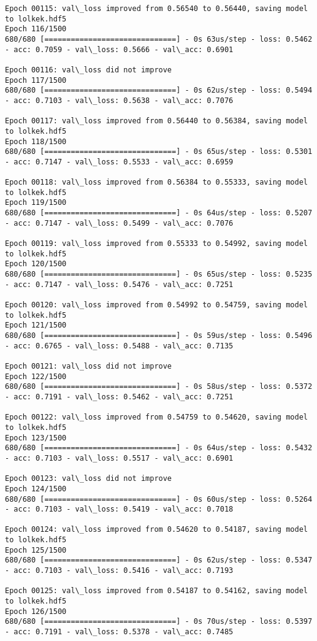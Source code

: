 \documentclass[11pt]{article}
\begin{document}
\begin{Verbatim}[commandchars=\\\{\}]
Epoch 00115: val\_loss improved from 0.56540 to 0.56440, saving model to lolkek.hdf5
Epoch 116/1500
680/680 [==============================] - 0s 63us/step - loss: 0.5462 - acc: 0.7059 - val\_loss: 0.5666 - val\_acc: 0.6901

Epoch 00116: val\_loss did not improve
Epoch 117/1500
680/680 [==============================] - 0s 62us/step - loss: 0.5494 - acc: 0.7103 - val\_loss: 0.5638 - val\_acc: 0.7076

Epoch 00117: val\_loss improved from 0.56440 to 0.56384, saving model to lolkek.hdf5
Epoch 118/1500
680/680 [==============================] - 0s 65us/step - loss: 0.5301 - acc: 0.7147 - val\_loss: 0.5533 - val\_acc: 0.6959

Epoch 00118: val\_loss improved from 0.56384 to 0.55333, saving model to lolkek.hdf5
Epoch 119/1500
680/680 [==============================] - 0s 64us/step - loss: 0.5207 - acc: 0.7147 - val\_loss: 0.5499 - val\_acc: 0.7076

Epoch 00119: val\_loss improved from 0.55333 to 0.54992, saving model to lolkek.hdf5
Epoch 120/1500
680/680 [==============================] - 0s 65us/step - loss: 0.5235 - acc: 0.7147 - val\_loss: 0.5476 - val\_acc: 0.7251

Epoch 00120: val\_loss improved from 0.54992 to 0.54759, saving model to lolkek.hdf5
Epoch 121/1500
680/680 [==============================] - 0s 59us/step - loss: 0.5496 - acc: 0.6765 - val\_loss: 0.5488 - val\_acc: 0.7135

Epoch 00121: val\_loss did not improve
Epoch 122/1500
680/680 [==============================] - 0s 58us/step - loss: 0.5372 - acc: 0.7191 - val\_loss: 0.5462 - val\_acc: 0.7251

Epoch 00122: val\_loss improved from 0.54759 to 0.54620, saving model to lolkek.hdf5
Epoch 123/1500
680/680 [==============================] - 0s 64us/step - loss: 0.5432 - acc: 0.7103 - val\_loss: 0.5517 - val\_acc: 0.6901

Epoch 00123: val\_loss did not improve
Epoch 124/1500
680/680 [==============================] - 0s 60us/step - loss: 0.5264 - acc: 0.7103 - val\_loss: 0.5419 - val\_acc: 0.7018

Epoch 00124: val\_loss improved from 0.54620 to 0.54187, saving model to lolkek.hdf5
Epoch 125/1500
680/680 [==============================] - 0s 62us/step - loss: 0.5347 - acc: 0.7103 - val\_loss: 0.5416 - val\_acc: 0.7193

Epoch 00125: val\_loss improved from 0.54187 to 0.54162, saving model to lolkek.hdf5
Epoch 126/1500
680/680 [==============================] - 0s 70us/step - loss: 0.5397 - acc: 0.7191 - val\_loss: 0.5378 - val\_acc: 0.7485


\end{Verbatim}
\end{document}
